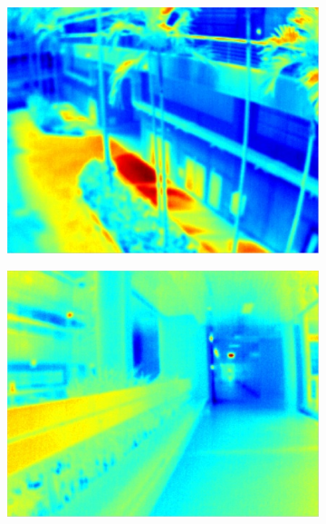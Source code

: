 \begin{figure}
\centering
	\begin{subfigure}{0.49\columnwidth}
    \centering
    \includegraphics[width=1.00\textwidth]{media/V_E_highsnr.jpg}
	    \caption{}
		\label{fig:edgeprocessing_1}
  \end{subfigure}
	\begin{subfigure}{0.49\columnwidth}
    \centering
    \includegraphics[width=1.00\textwidth]{media/V_E_lowsnr.jpg}
		\caption{}
		\label{fig:edgeprocessing_2}
  \end{subfigure} \vspace{10pt} \\ 

\end{figure}
